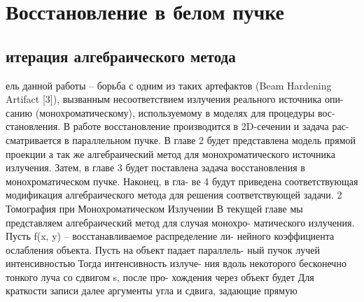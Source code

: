 \chapter{Восстановление в белом пучке} \label{chapt3}

\section{итерация алгебраического метода} \label{sect3_1}

ель данной работы – борьба с одним из таких артефактов (Beam Hardening
Artifact [3]), вызванным несоответствием излучения реального источника опи-
санию (монохроматическому), используемому в моделях для процедуры вос-
становления. В работе восстановление производится в 2D-сечении и задача рас-
сматривается в параллельном пучке.
В главе 2 будет представлена модель прямой проекции а так же алгебраический
метод для монохроматического источника излучения. Затем, в главе 3 будет
поставлена задача восстановления в монохроматическом пучке. Наконец, в гла-
ве 4 будут приведена соответствующая модификация алгебраического метода
для решения соответствующей задачи.
2
Томография при Монохроматическом Излучении
В текущей главе мы представляем алгебраический метод для случая монохро-
матического излучения. Пусть f(x, y) – восстанавливаемое распределение ли-
нейного коэффициента ослабления объекта. Пусть на объект падает параллель-
ный пучок лучей интенсивностью 
Тогда интенсивность излуче-
ния вдоль некоторого бесконечно тонкого луча со сдвигом s, %
 после про-
хождения через объект будет
Для краткости записи далее аргументы угла и сдвига, задающие прямую %

